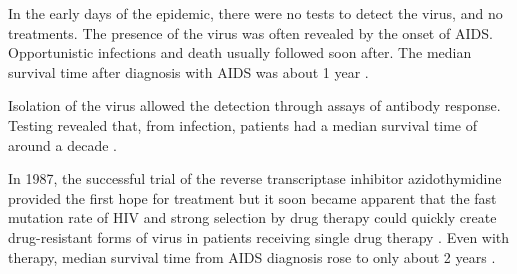 \documentclass[../sherrill-Mix_thesis.tex]{subfiles}
\begin{document}
	





	In the early days of the epidemic, there were no tests to detect the virus, and no treatments.  The presence of the virus was often revealed by the onset of AIDS. Opportunistic infections \citep{Moore1996} and death usually followed soon after. The median survival time after diagnosis with AIDS was about 1 year \citep{Rothenberg1987,Vella1992}. 

	Isolation of the virus allowed the detection through assays of antibody response. Testing revealed that, from infection, patients had a median survival time of around a decade \citep{Lui1986,Deschamps2000,Harrison2010,CGAIDSIHIVS2000}. %
	
	In 1987, the successful trial of the reverse transcriptase inhibitor azidothymidine provided the first hope for treatment \citep{Fischl1987,Fischl1989,Volberding1990} but it soon became apparent that the fast mutation rate of HIV \citep{Hahn1986,Preston1988,Roberts1988,Mansky1995,Mansky1996,Abram2010,Achuthan2014} and strong selection by drug therapy could quickly create drug-resistant forms of virus in patients receiving single drug therapy \citep{Larder1989,Larder1989a,Land1990,Boucher1990,Richman1990,Richman1991,Fitzgibbon1992,Richman1994,Schuurman1995,Schmit1996}. Even with therapy, median survival time from AIDS diagnosis rose to only about 2 years \citep{Creagh-Kirk1988,Fischl1989,Moore1992,Vella1992}. 
	
\end{document}
